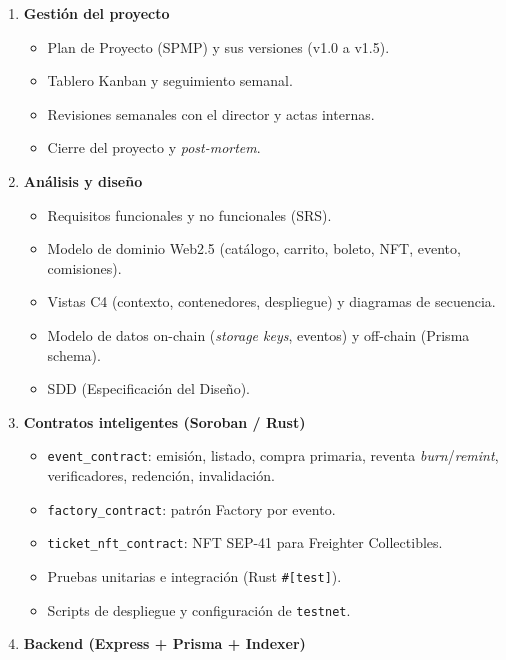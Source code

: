 \documentclass[12pt,oneside]{report}
\begin{document}
      \begin{enumerate}[label=\textbf{1.\arabic*},leftmargin=*]
        \item \textbf{Gestión del proyecto}
          \begin{itemize}[label=$\circ$]
            \item Plan de Proyecto (SPMP) y sus versiones (v1.0 a v1.5).
            \item Tablero Kanban y seguimiento semanal.
            \item Revisiones semanales con el director y actas internas.
            \item Cierre del proyecto y \textit{post-mortem}.
          \end{itemize}
        \item \textbf{Análisis y diseño}
          \begin{itemize}[label=$\circ$]
            \item Requisitos funcionales y no funcionales (SRS).
            \item Modelo de dominio Web2.5 (catálogo, carrito, boleto, NFT, evento, comisiones).
            \item Vistas C4 (contexto, contenedores, despliegue) y diagramas de secuencia.
            \item Modelo de datos on-chain (\textit{storage keys}, eventos) y off-chain (Prisma schema).
            \item SDD (Especificación del Diseño).
          \end{itemize}
        \item \textbf{Contratos inteligentes (Soroban / Rust)}
          \begin{itemize}[label=$\circ$]
            \item \texttt{event\_contract}: emisión, listado, compra primaria, reventa \textit{burn}/\textit{remint}, verificadores, redención, invalidación.
            \item \texttt{factory\_contract}: patrón Factory por evento.
            \item \texttt{ticket\_nft\_contract}: NFT SEP-41 para Freighter Collectibles.
            \item Pruebas unitarias e integración (Rust \texttt{\#[test]}).
            \item Scripts de despliegue y configuración de \texttt{testnet}.
          \end{itemize}
        \item \textbf{Backend (Express + Prisma + Indexer)}

\end{enumerate}
\end{document}
